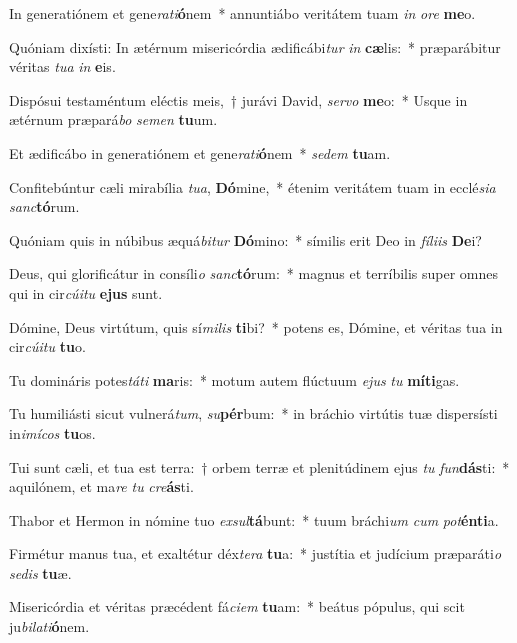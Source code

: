 \item In generatiónem et gene\textit{ra}\textit{ti}\textbf{ó}nem~* annuntiábo veritátem tuam \textit{in} \textit{o}\textit{re} \textbf{me}o.
\item Quóniam dixísti: In ætérnum misericórdia ædificábi\textit{tur} \textit{in} \textbf{cæ}lis:~* præparábitur véritas \textit{tu}\textit{a} \textit{in} \textbf{e}is.
\item Dispósui testaméntum eléctis meis,~† jurávi David, \textit{ser}\textit{vo} \textbf{me}o:~* Usque in ætérnum præpará\textit{bo} \textit{se}\textit{men} \textbf{tu}um.
\item Et ædificábo in generatiónem et gene\textit{ra}\textit{ti}\textbf{ó}nem~* \textit{se}\textit{dem} \textbf{tu}am.
\item Confitebúntur cæli mirabília \textit{tu}\textit{a}, \textbf{Dó}mine,~* étenim veritátem tuam in ecclé\textit{si}\textit{a} \textit{sanc}\textbf{tó}rum.
\item Quóniam quis in núbibus æquá\textit{bi}\textit{tur} \textbf{Dó}mino:~* símilis erit Deo in \textit{fí}\textit{li}\textit{is} \textbf{De}i?
\item Deus, qui glorificátur in consíli\textit{o} \textit{sanc}\textbf{tó}rum:~* magnus et terríbilis super omnes qui in cir\textit{cú}\textit{i}\textit{tu} \textbf{e}\textbf{jus} sunt.
\item Dómine, Deus virtútum, quis sí\textit{mi}\textit{lis} \textbf{ti}bi?~* potens es, Dómine, et véritas tua in cir\textit{cú}\textit{i}\textit{tu} \textbf{tu}o.
\item Tu domináris potes\textit{tá}\textit{ti} \textbf{ma}ris:~* motum autem flúctuum \textit{e}\textit{jus} \textit{tu} \textbf{mí}\textbf{ti}gas.
\item Tu humiliásti sicut vulnerá\textit{tum}, \textit{su}\textbf{pér}bum:~* in bráchio virtútis tuæ dispersísti in\textit{i}\textit{mí}\textit{cos} \textbf{tu}os.
\item Tui sunt cæli, et tua est terra:~† orbem terræ et plenitúdinem ejus \textit{tu} \textit{fun}\textbf{dás}ti:~* aquilónem, et ma\textit{re} \textit{tu} \textit{cre}\textbf{ás}ti.
\item Thabor et Hermon in nómine tuo \textit{ex}\textit{sul}\textbf{tá}bunt:~* tuum bráchi\textit{um} \textit{cum} \textit{pot}\textbf{én}\textbf{ti}a.
\item Firmétur manus tua, et exaltétur déx\textit{te}\textit{ra} \textbf{tu}a:~* justítia et judícium præparáti\textit{o} \textit{se}\textit{dis} \textbf{tu}æ.
\item Misericórdia et véritas præcédent fá\textit{ci}\textit{em} \textbf{tu}am:~* beátus pópulus, qui scit ju\textit{bi}\textit{la}\textit{ti}\textbf{ó}nem.
